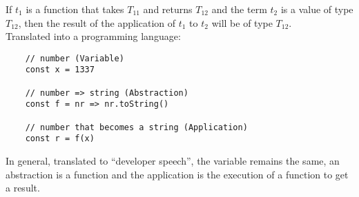 If $t_1$ is a function that takes $T_{11}$ and returns
$T_{12}$ and the term $t_2$ is a value of type $T_{12}$, then
the result of the application of $t_1$ to $t_2$ will
be of type $T_{12}$.
\\[12pt]
Translated into a programming language:

\begin{verbatim}
    // number (Variable)
    const x = 1337

    // number => string (Abstraction)
    const f = nr => nr.toString()

    // number that becomes a string (Application)
    const r = f(x)
\end{verbatim}

In general, translated to ``developer speech'', the variable
remains the same, an abstraction is a function and the application
is the execution of a function to get a result.
